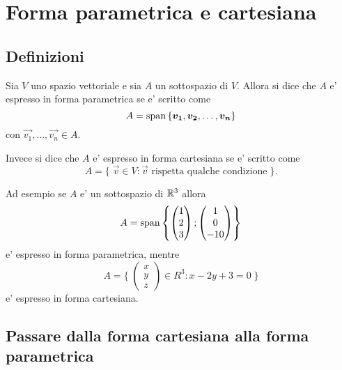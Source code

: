 \chapter{Forma parametrica e cartesiana}

\section{Definizioni}

\begin{definition}
    Sia $V$ uno spazio vettoriale e sia $A$ un sottospazio di $V$. Allora si dice che $A$ e' espresso in forma parametrica se e' scritto come \[
        A = \operatorname{span}\left\{\bm{v_1}, \bm{v_2}, \dots, \bm{v_n}\right\}    
    \] con $\vec{v_1}, \dots, \vec{v_n} \in A$.

    Invece si dice che $A$ e' espresso in forma cartesiana se e' scritto come \[
        A = \{\; \vec{v} \in V : \vec{v} \text{ rispetta qualche condizione} \;\}.
    \]
\end{definition}

Ad esempio se $A$ e' un sottospazio di $\mathbb{R}^3$ allora
 \[
    A = \operatorname{span}\left\{
        \begin{pmatrix} 1 \\ 2 \\ 3 \end{pmatrix}; \begin{pmatrix} 1 \\ 0 \\ -10 \end{pmatrix}
    \right\}    
\] e' espresso in forma parametrica, mentre
\[
    A = \{\; \begin{pmatrix}
        x \\ y \\ z
    \end{pmatrix} \in R^3 : x-2y+3 = 0 \;\}    
\] e' espresso in forma cartesiana.

\section{Passare dalla forma cartesiana alla forma parametrica}

